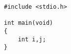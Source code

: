 \documentclass[12pt]{jarticle}
\begin{document}
\begin{verbatim}
#include <stdio.h>

int main(void)
{
    int i,j;
}
\end{verbatim}
\end{document}
